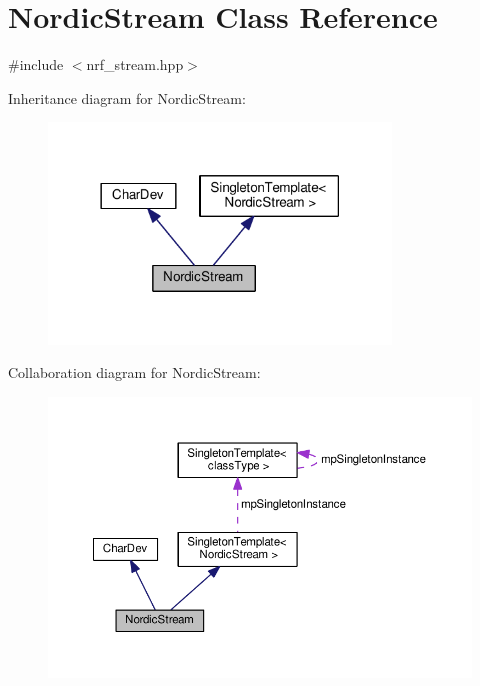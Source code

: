 \hypertarget{classNordicStream}{}\section{Nordic\+Stream Class Reference}
\label{classNordicStream}


{\ttfamily \#include $<$nrf\+\_\+stream.\+hpp$>$}



Inheritance diagram for Nordic\+Stream\+:\nopagebreak
\begin{figure}[H]
\begin{center}
\leavevmode
\includegraphics[width=258pt]{dc/dca/classNordicStream__inherit__graph}
\end{center}
\end{figure}


Collaboration diagram for Nordic\+Stream\+:\nopagebreak
\begin{figure}[H]
\begin{center}
\leavevmode
\includegraphics[width=350pt]{da/d1c/classNordicStream__coll__graph}
\end{center}
\end{figure}
